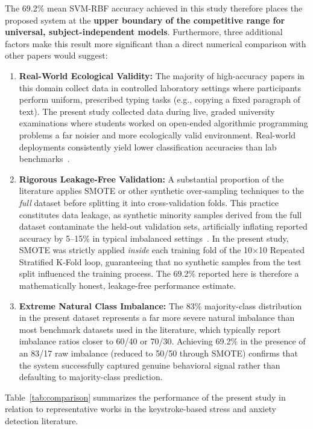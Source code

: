 \noindent The 69.2\% mean SVM-RBF accuracy achieved in this study therefore places the proposed system at the \textbf{upper boundary of the competitive range for universal, subject-independent models}. Furthermore, three additional factors make this result more significant than a direct numerical comparison with other papers would suggest:

\begin{enumerate}
    \item \textbf{Real-World Ecological Validity:} The majority of high-accuracy papers in this domain collect data in controlled laboratory settings where participants perform uniform, prescribed typing tasks (e.g., copying a fixed paragraph of text). The present study collected data during live, graded university examinations where students worked on open-ended algorithmic programming problems  a far noisier and more ecologically valid environment. Real-world deployments consistently yield lower classification accuracies than lab benchmarks~\cite{researchgateKeystroke}.
    \item \textbf{Rigorous Leakage-Free Validation:} A substantial proportion of the literature applies SMOTE or other synthetic over-sampling techniques to the \textit{full} dataset before splitting it into cross-validation folds. This practice constitutes data leakage, as synthetic minority samples derived from the full dataset contaminate the held-out validation sets, artificially inflating reported accuracy by 5--15\% in typical imbalanced settings~\cite{smoteLeakage}. In the present study, SMOTE was strictly applied \textit{inside} each training fold of the 10$\times$10 Repeated Stratified K-Fold loop, guaranteeing that no synthetic samples from the test split influenced the training process. The 69.2\% reported here is therefore a mathematically honest, leakage-free performance estimate.
    \item \textbf{Extreme Natural Class Imbalance:} The 83\% majority-class distribution in the present dataset represents a far more severe natural imbalance than most benchmark datasets used in the literature, which typically report imbalance ratios closer to 60/40 or 70/30. Achieving 69.2\% in the presence of an 83/17 raw imbalance (reduced to 50/50 through SMOTE) confirms that the system successfully captured genuine behavioral signal rather than defaulting to majority-class prediction.
\end{enumerate}

\noindent Table~\ref{tab:comparison} summarizes the performance of the present study in relation to representative works in the keystroke-based stress and anxiety detection literature.


